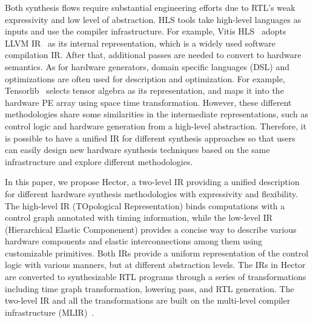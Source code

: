 Both synthesis flows require substantial engineering efforts due to RTL’s weak expressivity and low level of abstraction. HLS tools take high-level languages as inputs and use the compiler infrastructure. For example, Vitis HLS~\cite{VivadoHls} adopts LLVM IR~\cite{lattner2004llvm} as its internal representation, which is a widely used software compilation IR. After that, additional passes are needed to convert to hardware semantics. As for hardware generators, domain specific languages (DSL) and optimizations are often used for description and optimization. For example, Tensorlib~\cite{tensorlib} selects tensor algebra as its representation, and maps it into the hardware PE array using space time transformation.  However, these different methodologies share some similarities in the intermediate representations, such as control logic and hardware generation from a high-level abstraction. Therefore, it is possible to have a unified IR for different synthesis approaches so that users can easily design new hardware synthesis techniques based on the same infrastructure and explore different methodologies.




In this paper, we propose Hector, a two-level IR providing a unified description for different hardware synthesis methodologies with expressivity and flexibility. The high-level IR (TOpological Representation) binds computations with a control graph annotated with timing information, while the low-level IR (Hierarchical Elastic Componenent) provides a concise way to describe various hardware components and elastic interconnections among them using customizable primitives. Both IRs provide a uniform representation of the control logic with various manners, but at different abstraction levels. The IRs in Hector are converted to synthesizable RTL programs through a series of transformations including time graph transformation, lowering pass, and RTL generation. The two-level IR and all the transformations are built on the multi-level compiler infrastructure (MLIR)~\cite{mlir}. 


